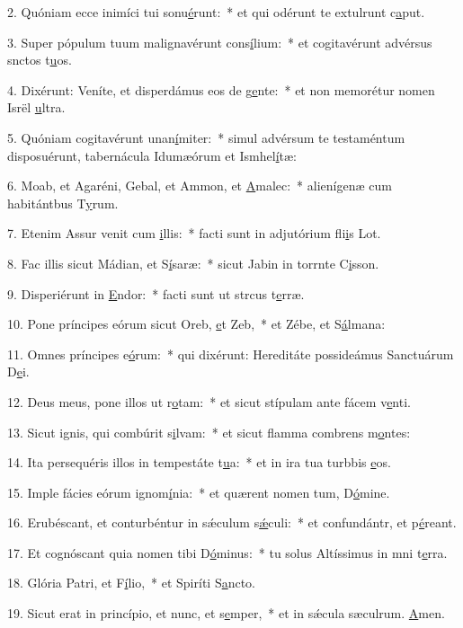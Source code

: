 2. Quóniam ecce inimíci tui sonu\uline{é}runt:~* et qui odérunt te extulrunt c\uline{a}put.\par 
3. Super pópulum tuum malignavérunt cons\uline{í}lium:~* et cogitavérunt advérsus snctos t\uline{u}os.\par 
4. Dixérunt: Veníte, et disperdámus eos de g\uline{e}nte:~* et non memorétur nomen Isrël \uline{u}ltra.\par 
5. Quóniam cogitavérunt unan\uline{í}miter:~* simul advérsum te testaméntum disposuérunt, tabernácula Idumæórum et Ismhel\uline{í}tæ:\par 
6. Moab, et Agaréni, Gebal, et Ammon, et \uline{A}malec:~* alienígenæ cum habitántbus T\uline{y}rum.\par 
7. Etenim Assur venit cum \uline{i}llis:~* facti sunt in adjutórium fli\uline{i}s Lot.\par 
8. Fac illis sicut Mádian, et S\uline{í}saræ:~* sicut Jabin in torrnte C\uline{i}sson.\par 
9. Disperiérunt in \uline{E}ndor:~* facti sunt ut strcus t\uline{e}rræ.\par 
10. Pone príncipes eórum sicut Oreb, \uline{e}t Zeb,~* et Zébe, et S\uline{á}lmana:\par 
11. Omnes príncipes e\uline{ó}rum:~* qui dixérunt: Hereditáte possideámus Sanctuárum D\uline{e}i.\par 
12. Deus meus, pone illos ut r\uline{o}tam:~* et sicut stípulam ante fácem v\uline{e}nti.\par 
13. Sicut ignis, qui combúrit s\uline{i}lvam:~* et sicut flamma combrens m\uline{o}ntes:\par 
14. Ita persequéris illos in tempestáte t\uline{u}a:~* et in ira tua turbbis \uline{e}os.\par 
15. Imple fácies eórum ignom\uline{í}nia:~* et quærent nomen tum, D\uline{ó}mine.\par 
16. Erubéscant, et conturbéntur in sǽculum s\uline{ǽ}culi:~* et confundántr, et p\uline{é}reant.\par 
17. Et cognóscant quia nomen tibi D\uline{ó}minus:~* tu solus Altíssimus in mni t\uline{e}rra.\par 
18. Glória Patri, et F\uline{í}lio,~* et Spiríti S\uline{a}ncto.\par 
19. Sicut erat in princípio, et nunc, et s\uline{e}mper,~* et in sǽcula sæculrum. \uline{A}men.\par 
